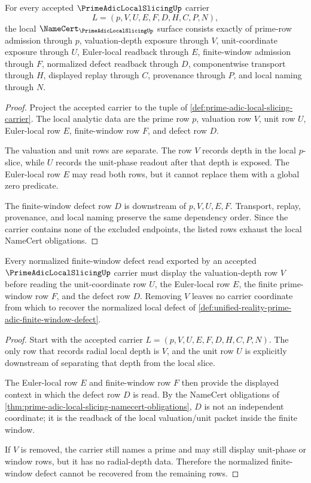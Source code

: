 \begin{theorem}
\label{thm:prime-adic-local-slicing-namecert-obligations}
For every accepted $\PrimeAdicLocalSlicingUp$ carrier
$$
L=(p,V,U,E,F,D,H,C,P,N),
$$
the local $\NameCert_{\PrimeAdicLocalSlicingUp}$ surface consists exactly of prime-row admission through $p$, valuation-depth exposure through $V$, unit-coordinate exposure through $U$, Euler-local readback through $E$, finite-window admission through $F$, normalized defect readback through $D$, componentwise transport through $H$, displayed replay through $C$, provenance through $P$, and local naming through $N$.
\end{theorem}
\begin{proof}
Project the accepted carrier to the tuple of \autoref{def:prime-adic-local-slicing-carrier}. The local analytic data are the prime row $p$, valuation row $V$, unit row $U$, Euler-local row $E$, finite-window row $F$, and defect row $D$.

The valuation and unit rows are separate. The row $V$ records depth in the local $p$-slice, while $U$ records the unit-phase readout after that depth is exposed. The Euler-local row $E$ may read both rows, but it cannot replace them with a global zero predicate.

The finite-window defect row $D$ is downstream of $p,V,U,E,F$. Transport, replay, provenance, and local naming preserve the same dependency order. Since the carrier contains none of the excluded endpoints, the listed rows exhaust the local NameCert obligations.
\end{proof}

\begin{theorem}
\label{thm:prime-adic-local-slicing-finite-window-defect-route}
Every normalized finite-window defect read exported by an accepted $\PrimeAdicLocalSlicingUp$ carrier must display the valuation-depth row $V$ before reading the unit-coordinate row $U$, the Euler-local row $E$, the finite prime-window row $F$, and the defect row $D$. Removing $V$ leaves no carrier coordinate from which to recover the normalized local defect of \autoref{def:unified-reality-prime-adic-finite-window-defect}.
\end{theorem}
\begin{proof}
Start with the accepted carrier $L=(p,V,U,E,F,D,H,C,P,N)$. The only row that records radial local depth is $V$, and the unit row $U$ is explicitly downstream of separating that depth from the local slice.

The Euler-local row $E$ and finite-window row $F$ then provide the displayed context in which the defect row $D$ is read. By the NameCert obligations of \autoref{thm:prime-adic-local-slicing-namecert-obligations}, $D$ is not an independent coordinate; it is the readback of the local valuation/unit packet inside the finite window.

If $V$ is removed, the carrier still names a prime and may still display unit-phase or window rows, but it has no radial-depth data. Therefore the normalized finite-window defect cannot be recovered from the remaining rows.
\end{proof}

